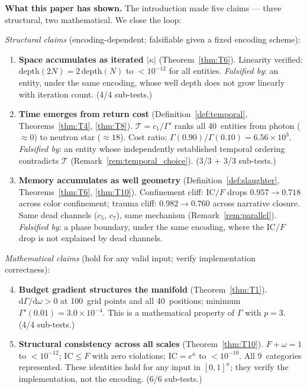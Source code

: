 \documentclass[
  aps,
  prd,
  twocolumn,
  superscriptaddress,
  nofootinbib,
  floatfix
]{revtex4-2}
\newcommand{\Gam}{\Gamma}
\newcommand{\dd}{\mathrm{d}}
\newcommand{\IC}{\mathrm{IC}}
\begin{document}
\textbf{What this paper has shown.}
The introduction made five claims --- three structural, two
mathematical.  We close the loop:

\emph{Structural claims} (encoding-dependent; falsifiable
given a fixed encoding scheme):

\begin{enumerate}
\item \textbf{Space accumulates as iterated $|\kappa|$}
  (Theorem~\ref{thm:T6}).
  Linearity verified: $\mathrm{depth}(2N) = 2\,\mathrm{depth}(N)$
  to $< 10^{-12}$ for all entities.
  \emph{Falsified by}: an entity, under the same encoding,
  whose well depth does not grow linearly with iteration
  count.  (4/4 sub-tests.)

\item \textbf{Time emerges from return cost}
  (Definition~\ref{def:temporal}, Theorems~\ref{thm:T4},
  \ref{thm:T8}).
  $\mathcal{T} = c_1/\Gam'$ ranks all 40~entities from
  photon ($\approx 0$) to neutron star ($\approx 18$).
  Cost ratio: $\Gam(0.90)/\Gam(0.10) = 6.56 \times 10^{3}$.
  \emph{Falsified by}: an entity whose independently
  established temporal ordering contradicts $\mathcal{T}$
  (Remark~\ref{rem:temporal_choice}).
  (3/3 + 3/3 sub-tests.)

\item \textbf{Memory accumulates as well geometry}
  (Definition~\ref{def:slaughter},
  Theorems~\ref{thm:T6}, \ref{thm:T10}).
  Confinement cliff: $\IC/F$ drops $0.957 \to 0.718$ across
  color confinement; trauma cliff: $0.982 \to 0.760$ across
  narrative closure.  Same dead channels ($c_5$, $c_7$), same
  mechanism (Remark~\ref{rem:parallel}).
  \emph{Falsified by}: a phase boundary, under the same
  encoding, where the $\IC/F$ drop is not explained by dead
  channels.
\end{enumerate}

\emph{Mathematical claims} (hold for any valid input;
verify implementation correctness):

\begin{enumerate}\setcounter{enumi}{3}
\item \textbf{Budget gradient structures the manifold}
  (Theorem~\ref{thm:T1}).
  $\dd\Gam/\dd\omega > 0$ at 100~grid points and all
  40~positions; minimum $\Gam'(0.01) = 3.0 \times 10^{-4}$.
  This is a mathematical property of $\Gam$ with $p = 3$.
  (4/4 sub-tests.)

\item \textbf{Structural consistency across all scales}
  (Theorem~\ref{thm:T10}).
  $F + \omega = 1$ to $< 10^{-12}$; $\IC \leq F$ with zero
  violations; $\IC = e^{\kappa}$ to $< 10^{-10}$.  All
  9~categories represented.  These identities hold for any
  input in $[0,1]^n$; they verify the implementation, not
  the encoding.  (6/6 sub-tests.)
\end{enumerate}
\end{document}
